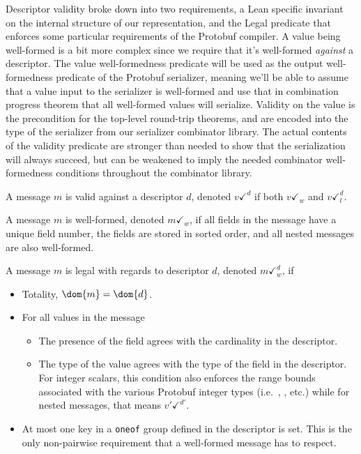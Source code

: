 Descriptor validity broke down into two requirements, a Lean specific invariant
on the internal structure of our representation, and the Legal predicate that
enforces some particular requirements of the Protobuf compiler. A value being
well-formed is a bit more complex since we require that it's well-formed
\emph{against} a descriptor. The value well-formedness predicate will be used as
the output well-formedness predicate of the Protobuf serializer, meaning we'll
be able to assume that a value input to the serializer is well-formed and
use that in combination progress theorem that all well-formed values will
serialize. Validity on the value is the precondition for the top-level
round-trip theorems, and are encoded into the type of the serializer from our
serializer combinator library. The actual contents of the validity predicate are
stronger than needed to show that the serialization will always succeed, but can
be weakened to imply the needed combinator well-formedness conditions throughout the
combinator library.

\vspace{1em}
\begin{definition}\label{def:vvalid}
  A message $m$ is valid against a descriptor $d$, denoted $v \checkmark^d$ if
  both $v \checkmark_w$ and $v \checkmark_l^d$. 
\end{definition}

\vspace{1em}
\begin{definition}\label{def:vwf}
  A message $m$ is well-formed, denoted $m \checkmark_w$, if all fields in
  the message have a unique field number, the fields are stored in sorted
  order, and all nested messages are also well-formed.
\end{definition}

\vspace{1em}
\begin{definition}\label{def:vlegal}
  A message $m$ is legal with regards to descriptor $d$, denoted $m
  \checkmark_w^d$, if
  \begin{itemize}
  \item Totality, $\dom{m} = \dom{d}$.
  \item For all values in the message
    \begin{itemize}
    \item The presence of the field agrees with the cardinality in the
      descriptor.
    \item The type of the value agrees with the type of the field in the
      descriptor. For integer scalars, this condition also enforces the range
      bounds associated with the various Protobuf integer types (i.e.\ \ints{},
      \uintl{}, etc.) while for nested messages, that means $v' \checkmark^{d'}$.
    \end{itemize}
  \item At most one key in a \texttt{oneof} group defined in the descriptor is
    set. This is the only non-pairwise requirement that a well-formed message has
    to respect.
  \end{itemize}
\end{definition}

